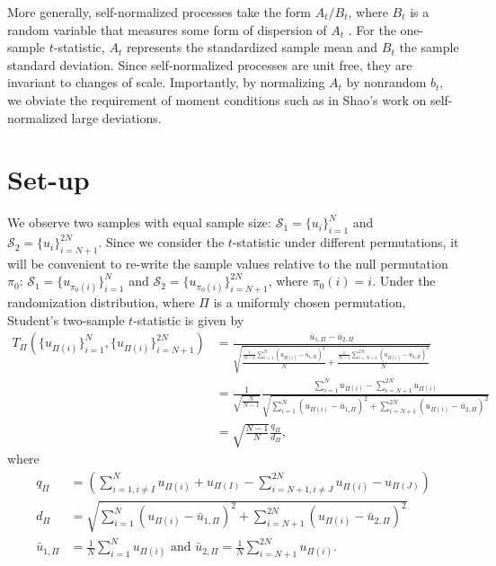 More generally, self-normalized processes take the form $A_t/B_t$,
where $B_t$ is a random variable that measures some form of dispersion
of $A_t$ \cite{de2004self}.  For the one-sample $t$-statistic, $A_t$
represents the standardized sample mean and $B_t$ the sample standard
deviation.  Since self-normalized processes are unit free, they are invariant to changes of
scale.  Importantly, by normalizing $A_t$ by nonrandom $b_t$, we
obviate the requirement of moment conditions such as in Shao's \cite{shao1997self}
work on self-normalized large deviations.

\section{Set-up}
We observe two samples with equal sample size: $\mathcal{S}_1 = \{u_i\}_{i=1}^N$
and $\mathcal{S}_2 = \{u_i\}_{i=N+1}^{2N}$.  Since we consider the $t$-statistic
under different permutations, it will be convenient to re-write the
sample values relative to the null permutation $\pi_0$: $\mathcal{S}_1 =
\{u_{\pi_0(i)}\}_{i=1}^N$ and $\mathcal{S}_2 = \{u_{\pi_0(i)}\}_{i=N+1}^{2N}$,
where $\pi_0(i) = i$.  Under the randomization distribution, where
$\Pi$ is a uniformly chosen permutation, Student's two-sample
$t$-statistic is given by
\begin{align*}
T_{\Pi}(\{u_{\Pi(i)}\}_{i=1}^N, \{u_{\Pi(i)}\}_{i=N+1}^{2N})
&= \frac{\bar{u}_{1,\Pi} - \bar{u}_{2,\Pi}}{\sqrt{\frac{\frac{1}{N-1}
      \sum_{i=1}^N(u_{\Pi(i)} - \bar{u}_{1,\Pi})^2}{N} + \frac{\frac{1}{N-1}
      \sum_{i=N+1}^{2N}(u_{\Pi(i)} - \bar{u}_{2,\Pi})^2}{N}}} \\
&= \frac{1}{\sqrt{\frac{N}{N-1}}} \frac{\sum_{i=1}^N u_{\Pi(i)} -
  \sum_{i=N+1}^{2N}u_{\Pi(i)}}{\sqrt{\sum_{i=1}^N(u_{\Pi(i)} -
    \bar{u}_{1,\Pi})^2 + \sum_{i=N+1}^{2N}(u_{\Pi(i)} - \bar{u}_{2,\Pi})^2}} \\
&= \sqrt{\frac{N-1}{N}}\frac{q_\Pi}{d_\Pi},
\end{align*}
where
\begin{align*}
  q_\Pi &= \left (\sum_{i=1, i\neq I}^N u_{\Pi(i)} + u_{\Pi(I)} -
    \sum_{i=N+1, i\neq J}^{2N}u_{\Pi(i)} - u_{\Pi(J)}\right ) \\
  d_\Pi &= \sqrt{\sum_{i=1}^N(u_{\Pi(i)} - \bar{u}_{1,\Pi})^2 +
    \sum_{i=N+1}^{2N}(u_{\Pi(i)} - \bar{u}_{2,\Pi})^2} \\
  \bar{u}_{1,\Pi} &= \frac{1}{N} \sum_{i=1}^N u_{\Pi(i)} \text{ and }
  \bar{u}_{2,\Pi} = \frac{1}{N} \sum_{i=N+1}^{2N} u_{\Pi(i)}.
\end{align*}

